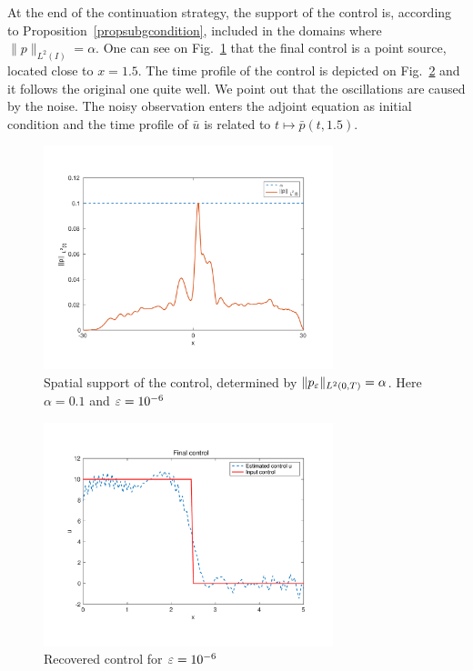 At the end of the continuation strategy, the support of the control is, according to Proposition~\ref{propsubgcondition}, included in the domains where $\|p\|_{L^2(I)} = \alpha$. One can see on Fig.~\ref{support} that the final control is a point source, located close to $x=1.5$. The time profile of the control is depicted on Fig.~\ref{recoveredcontrol} and it follows the original one quite well. We point out that the oscillations are caused by the noise. The noisy observation enters the adjoint equation as initial condition and the time profile of $\bar u$ is related to $t\mapsto\bar p(t,1.5)$.
\begin{figure}[!h]
\includegraphics[width = 0.75\textwidth]{images/normp.pdf}
\caption{Spatial support of the control, determined by $\lVert p_{\varepsilon}\rVert_{L^2(0,T)} = \alpha$. Here $\alpha = 0.1$ and $\varepsilon = 10^{-6}$}
\label{support}
\end{figure}
\begin{figure}[!h]
 \includegraphics[width = 0.75\textwidth]{images/ex1recoveredcontrol2.pdf}
 \caption{Recovered control for $\varepsilon = 10^{-6}$}
 \label{recoveredcontrol}
\end{figure}
